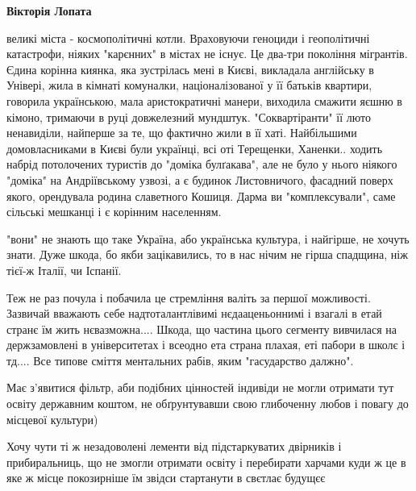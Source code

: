 \begin{itemize}
\begin{itemize}
\textbf{Вікторія Лопата} 

великі міста - космополітичні котли. Враховуючи геноциди і геополітичні
катастрофи, ніяких "карєнних" в містах не існує. Це два-три покоління
мігрантів. Єдина корінна киянка, яка зустрілась мені в Києві, викладала
англійську в Універі, жила в кімнаті комуналки, націоналізованої у її батьків
квартири, говорила українською, мала аристократичні манери, виходила смажити
яєшню в кімоно, тримаючи в руці довжелезний мундштук. "Соквартіранти" її люто
ненавиділи, найперше за те, що фактично жили в її хаті. Найбільшими
домовласниками в Києві були українці, всі оті Терещенки, Ханенки.. ходить
набрід потолочених туристів до "доміка булґакава", але не було у нього ніякого
"доміка" на Андріївському узвозі, а є будинок Листовничого, фасадний поверх
якого, орендувала родина славетного Кошиця. Дарма ви "комплексували", саме
сільські мешканці і є корінним населенням.

\end{itemize}

 

"вони" не знають що таке Україна, або українська культура, і найгірше, не
хочуть знати. Дуже шкода, бо якби зацікавились, то в нас нічим не гірша
спадщина, ніж тієї-ж Італії, чи Іспанії.


 

Теж не раз почула і побачила це стремління валіть за першої можливості.
Зазвичай вважають себе надтоталантлівимі нєдааценьоннимі і взагалі в етай
странє їм жить нєвазможна.... Шкода, що частина цього сегменту вивчилася на
держзамовлені в університетах і всеодно ета страна плахая, еті пабори в школє і
тд.... Все типове сміття ментальних рабів, яким "гасударство далжно".

Має з'явитися фільтр, аби подібних цінностей індивіди не могли отримати тут
освіту державним коштом, не обґрунтувавши свою глибоченну любов і повагу до
місцевої культури)

Хочу чути ті ж незадоволені лементи від підстаркуватих двірників і
прибиральниць, що не змогли отримати освіту і перебирати харчами куди ж це в
яке ж місце покозирніше їм звідси стартанути в свєтлає будущєє🤔


\end{itemize}
